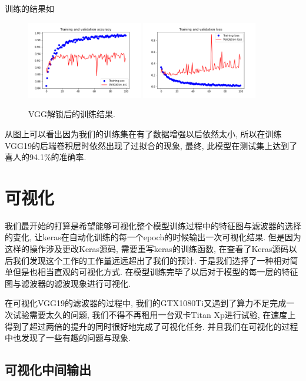 \documentclass[lang=cn,11pt]{elegantpaper}
\begin{document}
训练的结果如 

\begin{figure}[hbt]
\centering
 \includegraphics[width=0.45\textwidth]{VGG_19_unlocked_1}
  \includegraphics[width=0.45\textwidth]{VGG_19_unlocked_2}
 \caption{VGG解锁后的训练结果.\label{fig:vggunlock}}
\end{figure}

从图上可以看出因为我们的训练集在有了数据增强以后依然太小, 所以在训练VGG19的后端卷积层时依然出现了过拟合的现象, 最终, 此模型在测试集上达到了喜人的94.1\%的准确率.

\section{可视化}

我们最开始的打算是希望能够可视化整个模型训练过程中的特征图与滤波器的选择的变化, 让keras在自动化训练的每一个epoch的时候输出一次可视化结果. 但是因为这样的操作涉及更改Keras源码, 需要重写keras的训练函数, 在查看了Keras源码以后我们发现这个工作的工作量远远超出了我们的预计. 于是我们选择了一种相对简单但是也相当直观的可视化方式. 在模型训练完毕了以后对于模型的每一层的特征图与滤波器的滤波现象进行可视化.

在可视化VGG19的滤波器的过程中, 我们的GTX1080Ti又遇到了算力不足完成一次试验需要太久的问题, 我们不得不再租用一台双卡Titan Xp进行试验, 在速度上得到了超过两倍的提升的同时很好地完成了可视化任务. 并且我们在可视化的过程中也发现了一些有趣的问题与现象.

\subsection{可视化中间输出}
\end{document}
